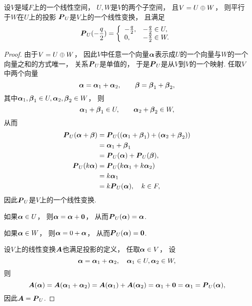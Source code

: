 \begin{theorem}\label{theorem:线性映射.投影是线性变换}
设\(V\)是域\(F\)上的一个线性空间，
\(U,W\)是\(V\)的两个子空间，
且\(V=U \oplus W\)，
则平行于\(W\)在\(U\)上的投影
\(\boldsymbol{P}_U\)是\(V\)上的一个线性变换，
且满足\[
	\boldsymbol{P}_U(-\frac{q}{2})
	=\left\{ \begin{array}{ll}
		-\frac{q}{2}, & -\frac{q}{2}\in U, \\
		0, & -\frac{q}{2}\in W.
	\end{array} \right.
\]
\begin{proof}
由于\(V = U \oplus W\)，
因此\(V\)中任意一个向量\(\boldsymbol\alpha\)表示成\(U\)的一个向量与\(W\)的一个向量之和的方式唯一，
关系\(\boldsymbol{P}_U\)是单值的，
于是\(\boldsymbol{P}_U\)是从\(V\)到\(V\)的一个映射.
任取\(V\)中两个向量\[
	\boldsymbol\alpha = \boldsymbol\alpha_1 + \boldsymbol\alpha_2,
	\qquad
	\boldsymbol\beta = \boldsymbol\beta_1 + \boldsymbol\beta_2,
\]
其中\(\boldsymbol\alpha_1,\boldsymbol\beta_1 \in U,
\boldsymbol\alpha_2,\boldsymbol\beta_2 \in W\)，
则\[
	\boldsymbol\alpha_1 + \boldsymbol\beta_1
	\in U,
	\qquad
	\boldsymbol\alpha_2 + \boldsymbol\beta_2
	\in W,
\]
从而\begin{align*}
	\boldsymbol{P}_U(\boldsymbol\alpha + \boldsymbol\beta)
	&= \boldsymbol{P}_U((\boldsymbol\alpha_1 + \boldsymbol\beta_1) + (\boldsymbol\alpha_2 + \boldsymbol\beta_2)) \\
	&= \boldsymbol\alpha_1 + \boldsymbol\beta_1 \\
	&= \boldsymbol{P}_U(\boldsymbol\alpha) + \boldsymbol{P}_U(\boldsymbol\beta), \\
	\boldsymbol{P}_U(k \boldsymbol\alpha)
	&= \boldsymbol{P}_U(k \boldsymbol\alpha_1 + k \boldsymbol\alpha_2) \\
	&= k \boldsymbol\alpha_1 \\
	&= k \boldsymbol{P}_U(\boldsymbol\alpha),
	\quad k \in F,
\end{align*}
因此\(\boldsymbol{P}_U\)是\(V\)上的一个线性变换.

如果\(\boldsymbol\alpha \in U\)，
则\(\boldsymbol\alpha = \boldsymbol\alpha + \boldsymbol0\)，
从而\(\boldsymbol{P}_U(\boldsymbol\alpha) = \boldsymbol\alpha\).

如果\(\boldsymbol\alpha \in W\)，
则\(\boldsymbol\alpha = 0 + \boldsymbol\alpha\)，
从而\(\boldsymbol{P}_U(\boldsymbol\alpha) = \boldsymbol0\).

设\(V\)上的线性变换\(\boldsymbol{A}\)也满足投影的定义，
任取\(\boldsymbol\alpha \in V\)，
设\[
	\boldsymbol\alpha = \boldsymbol\alpha_1 + \boldsymbol\alpha_2,
	\quad
	\boldsymbol\alpha_1 \in U,
	\boldsymbol\alpha_2 \in W,
\]
则\[
	\boldsymbol{A}(\boldsymbol\alpha)
	= \boldsymbol{A}(\boldsymbol\alpha_1 + \boldsymbol\alpha_2)
	= \boldsymbol{A}(\boldsymbol\alpha_1) + \boldsymbol{A}(\boldsymbol\alpha_2)
	= \boldsymbol\alpha_1 + \boldsymbol0
	= \boldsymbol\alpha_1
	= \boldsymbol{P}_U(\boldsymbol\alpha),
\]
因此\(\boldsymbol{A} = \boldsymbol{P}_U\).
\end{proof}
\end{theorem}

